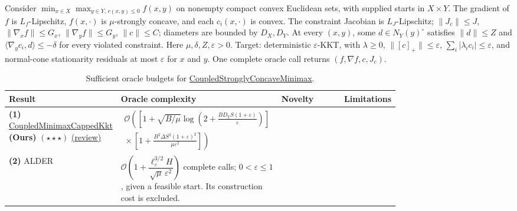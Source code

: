 \begin{table}[tp]
\centering
\caption{Sufficient oracle budgets for \href{https://github.com/k3nfalt/longtails/blob/main/LongTails/Setups/CoupledStronglyConcaveMinimax.lean}{CoupledStronglyConcaveMinimax}.}\label{tab:CoupledStronglyConcaveMinimax}
\parbox{\linewidth}{\footnotesize
Consider $\min_{x\in X}\max_{y\in Y,\,c(x,y)\le0}f(x,y)$ on nonempty compact convex Euclidean sets, with supplied starts in $X\times Y$. The gradient of $f$ is $L_f$-Lipschitz, $f(x,\cdot)$ is $\mu$-strongly concave, and each $c_i(x,\cdot)$ is convex. The constraint Jacobian is $L_J$-Lipschitz; $\|J_c\|\le J$, $\|\nabla_x f\|\le G_x$, $\|\nabla_y f\|\le G_y$, $\|c\|\le C$; diameters are bounded by $D_X,D_Y$. At every $(x,y)$, some $d\in N_Y(y)^\circ$ satisfies $\|d\|\le Z$ and $\langle\nabla_y c_i,d\rangle\le-\delta$ for every violated constraint. Here $\mu,\delta,Z,\varepsilon>0$. Target: deterministic $\varepsilon$-KKT, with $\lambda\ge0$, $\|[c]_+\|\le\varepsilon$, $\sum_i|\lambda_i c_i|\le\varepsilon$, and normal-cone stationarity residuals at most $\varepsilon$ for $x$ and $y$. One complete oracle call returns $(f,\nabla f,c,J_c)$.}\par\smallskip
\begin{threeparttable}
\footnotesize
\setlength{\tabcolsep}{4pt}\renewcommand{\arraystretch}{1.25}
\begin{tabularx}{\linewidth}{@{}>{\raggedright\arraybackslash}p{0.20\linewidth}>{\raggedright\arraybackslash}p{0.32\linewidth}>{\raggedright\arraybackslash}p{0.25\linewidth}>{\raggedright\arraybackslash}X@{}}
\toprule
\textbf{Result} & \textbf{Oracle complexity} & \textbf{Novelty} & \textbf{Limitations} \\
\midrule
\textbf{(1)} \href{https://github.com/k3nfalt/longtails/blob/main/LongTails/Theorems/CoupledMinimaxCappedKkt.lean}{Coupled\allowbreak Minimax\allowbreak Capped\allowbreak Kkt} \textbf{(Ours)} $(\star\star\star)$ \href{https://github.com/k3nfalt/longtails/blob/main/scripts/reviews/CoupledMinimaxCappedKkt.md}{(review)}
& $\begin{gathered}\mathcal{O}\!\left(\left[1+\sqrt{B/\mu}\log\!\left(2+\frac{BD_YS(1+\varepsilon)}{\varepsilon}\right)\right]\right.\\[-2pt]\left.{}\times\left[1+\frac{B^2\Delta S^2(1+\varepsilon)^2}{\mu\varepsilon^2}\right]\right)\end{gathered}$
& & \\
\midrule[1.2pt]
\textbf{(2)} ALDER \citep[Theorem 16]{cscmAlderV1Verified}
& $\mathcal{O}\!\left(1+\dfrac{\ell_\varepsilon^{3/2}H}{\sqrt\mu\,\varepsilon^2}\right)$ complete calls; $0<\varepsilon\le1$, given a feasible start. Its construction cost is excluded.

\end{tabularx}
\end{threeparttable}
\end{table}
